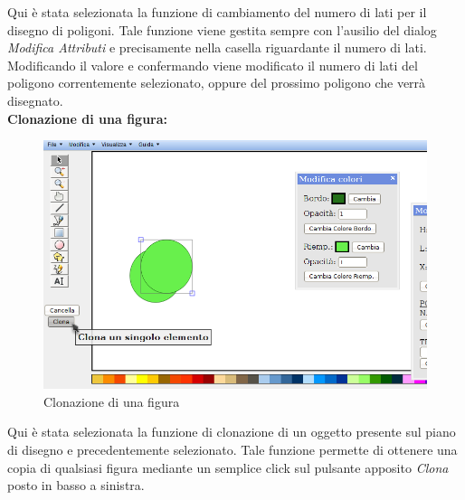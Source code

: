 \vspace{50pt}
Qui \`e stata selezionata la funzione di cambiamento del numero di lati per il disegno di poligoni. Tale funzione viene gestita sempre con l'ausilio del dialog \textit{Modifica Attributi} e precisamente nella casella riguardante il numero di lati. Modificando il valore e confermando viene modificato il numero di lati del poligono correntemente selezionato, oppure del prossimo poligono che verr\`a disegnato. \\
\newpage
 \textbf{Clonazione di una figura:}
\begin{figure}[!ht]
\centering
\includegraphics[scale=0.5]{images/clona.png}
\caption{Clonazione di una figura}
\end{figure}
 
 
\vspace{50pt}
Qui \`e stata selezionata la funzione di clonazione di un oggetto presente sul piano di disegno e precedentemente selezionato. Tale funzione permette di ottenere una copia di qualsiasi figura mediante un semplice click sul pulsante apposito \textit{Clona} posto in basso a sinistra. \\
\newpage

